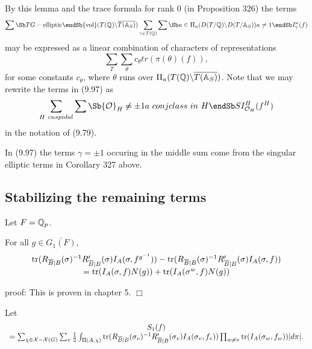 By this lemma and the trace formula for rank 0 (in
Proposition 326)
the terms 
\begin{equation}
\sum\Sb T \; \\ G-\mathrm{elliptic} \endSb
{\rm vol}(T({\Bbb{Q}})\backslash \overline{T({\Bbb{A}}_S)})
\sum_{\gamma \in T({\Bbb{Q}})}
\sum\Sb \kappa \in \Pi _u(D(T/{\Bbb Q})\backslash D(T/{\Bbb{A}}_S))
\\ \kappa \neq 1
\endSb
I_\gamma ^\kappa (f)
\end{equation}
may be expressed as a linear combination of characters of representations 
\begin{equation}
\sum_T
\sum_\theta c_\theta tr(\pi (\theta )(f)),
\end{equation}
for some constants $c_\theta$, where $\theta$ runs over
$\Pi_u(T({\Bbb{Q}})\backslash \overline{T({\Bbb{A}}_S)})$.
Note that we may rewrite the terms in (9.97) as
\[
\sum_{H\ cuspidal}
\sum\Sb {\cal O}_H\not= \pm 1\\
a\ conj\\
class\ in\ H
\endSb
SI_{{\cal O}_H}^H(f^H)
\]
in the notation of (9.79).

In (9.97) the terms $\gamma =\pm 1$ occuring
in the middle sum come from the singular elliptic terms in
Corollary 327 above.

\subsection{Stabilizing the remaining terms}

Let $F={\Bbb{Q}}_p$.

\begin{lemma} For all $g\in \overline{G_1(F)}$,
\[
\begin{array}{c}
{\rm tr}(R_{\overline{B}|B}(\sigma)^{-1}
R'_{\overline{B}|B}(\sigma)I_A(\sigma,f^{g^{-1}}))
-{\rm tr}(R_{\overline{B}|B}(\sigma)^{-1}
R'_{\overline{B}|B}(\sigma)I_A(\sigma,f))\\
={\rm tr}(I_A(\sigma,f)N(g))+{\rm tr}(I_A(\sigma^w,f)N(g))
\end{array}
\]
\end{lemma}

proof: This is proven in chapter 5. $\Box$

Let
\begin{equation}
\begin{array}{c}
S_1(f)\\
=\sum_{\chi\in{\cal{X}}-{\cal{X}}(G)}
\sum_v {1\over 2}
\int_{\Pi(A,\chi)}
{\rm tr}(R_{\overline{B}|B}(\sigma_v)^{-1}
R'_{\overline{B}|B}(\sigma_v)I_A(\sigma_v,f_v))
\prod_{w\not= v}
{\rm tr}(I_A(\sigma_w,f_w))|d\pi |.
\end{array}
\end{equation}

